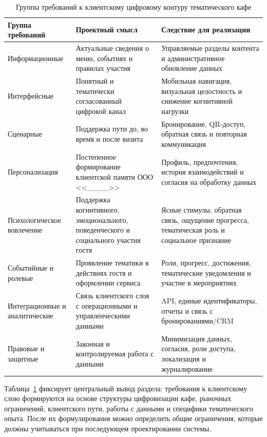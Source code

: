 \begin{table}[H]
\centering
\small
\caption{Группы требований к клиентскому цифровому контуру тематического кафе}
\label{tab:client_layer_requirements}
\begin{tabularx}{\textwidth}{|>{\raggedright\arraybackslash}p{}|>{\raggedright\arraybackslash}p{}|>{\raggedright\arraybackslash}X|}
\hline
\textbf{Группа требований} & \textbf{Проектный смысл} & \textbf{Следствие для реализации} \\ \hline
Информационные & Актуальные сведения о меню, событиях и правилах участия & Управляемые разделы контента и административное обновление данных \\ \hline
Интерфейсные & Понятный и тематически согласованный цифровой канал & Мобильная навигация, визуальная целостность и снижение когнитивной нагрузки \\ \hline
Сценарные & Поддержка пути до, во время и после визита & Бронирование, QR-доступ, обратная связь и повторная коммуникация \\ \hline
Персонализация & Постепенное формирование клиентской памяти ООО <<\_\_\_\_>> & Профиль, предпочтения, история взаимодействий и согласия на обработку данных \\ \hline
Психологическое вовлечение & Поддержка когнитивного, эмоционального, поведенческого и социального участия гостя & Ясные стимулы, обратная связь, ощущение прогресса, тематическая роль и социальное признание \\ \hline
Событийные и ролевые & Проявление тематики в действиях гостя и оформлении сервиса & Роли, прогресс, достижения, тематические уведомления и участие в мероприятиях \\ \hline
Интеграционные и аналитические & Связь клиентского слоя с операционными и управленческими данными & API, единые идентификаторы, отчеты и связь с бронированиями/CRM \\ \hline
Правовые и защитные & Законная и контролируемая работа с данными & Минимизация данных, согласия, роли доступа, локализация и журналирование \\ \hline
\end{tabularx}
\normalsize
\end{table}

Таблица~\ref{tab:client_layer_requirements} фиксирует центральный вывод раздела: требования к клиентскому слою формируются на основе структуры цифровизации кафе, рыночных ограничений, клиентского пути, работы с данными и специфики тематического опыта. После их формулирования можно определить общие ограничения, которые должны учитываться при последующем проектировании системы.

